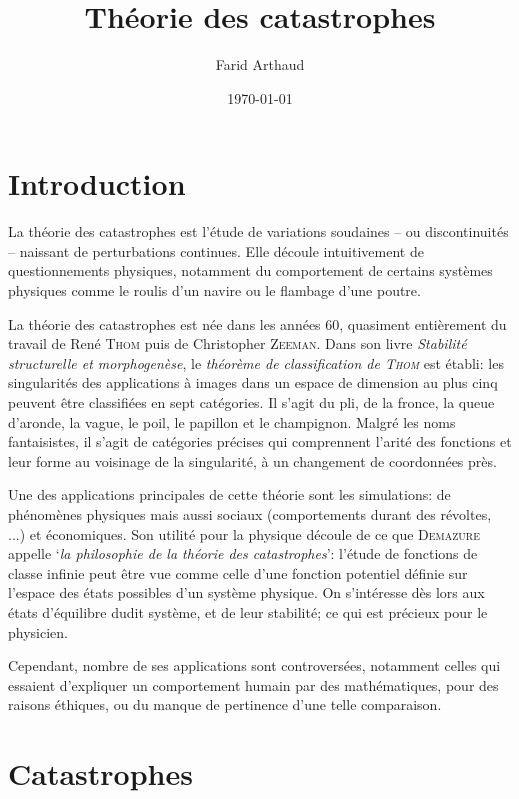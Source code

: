 \documentclass[a4paper]{article}
\theoremstyle{definition}
\begin{document}


\title{Théorie des catastrophes}
\author{Farid Arthaud}
\date{\today}
\maketitle

\section{Introduction}

La théorie des catastrophes est l'étude de variations soudaines -- ou discontinuités -- naissant de perturbations continues. Elle découle intuitivement de questionnements physiques, notamment du comportement de certains systèmes physiques comme le roulis d'un navire ou le flambage d'une poutre.

La théorie des catastrophes est née dans les années 60, quasiment entièrement du travail de René \textsc{Thom} puis de Christopher \textsc{Zeeman}.
Dans son livre \textit{Stabilité structurelle et morphogenèse}, le \textit{théorème de classification de \textsc{Thom}} est établi: les singularités des applications à images dans un espace de dimension au plus cinq peuvent être classifiées en sept catégories.
Il s'agit du pli, de la fronce, la queue d'aronde, la vague, le poil, le papillon et le champignon.
Malgré les noms fantaisistes, il s'agit de catégories précises qui comprennent l'arité des fonctions et leur forme au voisinage de la singularité, à un changement de coordonnées près.

Une des applications principales de cette théorie sont les simulations: de phénomènes physiques mais aussi sociaux (comportements durant des révoltes, ...) et économiques.
Son utilité pour la physique découle de ce que \textsc{Demazure} appelle `\textit{la philosophie de la théorie des catastrophes}': l'étude de fonctions de classe infinie peut être vue comme celle d'une fonction potentiel définie sur l'espace des états possibles d'un système physique.
On s'intéresse dès lors aux états d'équilibre dudit système, et de leur stabilité; ce qui est précieux pour le physicien.

Cependant, nombre de ses applications sont controversées, notamment celles qui essaient d'expliquer un comportement humain par des mathématiques, pour des raisons éthiques, ou du manque de pertinence d'une telle comparaison.

\section{Catastrophes}
\end{document}
